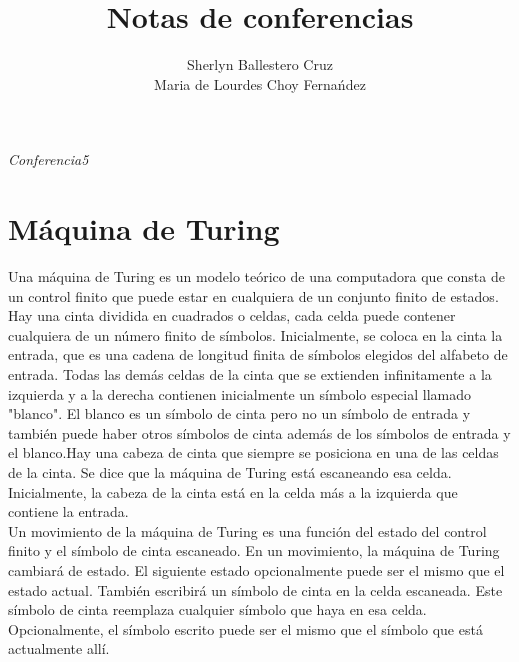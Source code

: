 \documentclass[12pt,a4paper]{article}
\title{Notas de conferencias}
\author{Sherlyn Ballestero Cruz \\ Maria de Lourdes Choy Ferna\'ndez}
\begin{document}
\maketitle
\newpage
\pagestyle{myheadings}
\textit{Conferencia5}\\
 
\section{M\'aquina de Turing}
Una máquina de Turing es un modelo teórico de una computadora que  consta de un control finito que puede estar en cualquiera de un conjunto finito de estados. Hay una cinta dividida en cuadrados o celdas, cada celda puede contener cualquiera de un número finito de símbolos. Inicialmente, se coloca en la cinta la entrada, que es una cadena de longitud finita de símbolos elegidos del alfabeto de entrada. Todas las demás celdas de la cinta que se extienden infinitamente a la izquierda y a la derecha contienen inicialmente un símbolo especial llamado "blanco". El blanco es un símbolo de cinta pero no un símbolo de entrada y también puede haber otros símbolos de cinta además de los símbolos de entrada y el blanco.Hay una cabeza de cinta que siempre se posiciona en una de las celdas de la cinta. Se dice que la máquina de Turing está escaneando esa celda. Inicialmente, la cabeza de la cinta está en la celda más a la izquierda que contiene la entrada.\\
Un movimiento de la máquina de Turing es una función del estado del control finito y el símbolo de cinta escaneado. En un movimiento, la máquina de Turing cambiará de estado. El siguiente estado opcionalmente puede ser el mismo que el estado actual. También escribirá un símbolo de cinta en la celda escaneada. Este símbolo de cinta reemplaza cualquier símbolo que haya en esa celda. Opcionalmente, el símbolo escrito puede ser el mismo que el símbolo que está actualmente allí.
 
\end{document}

